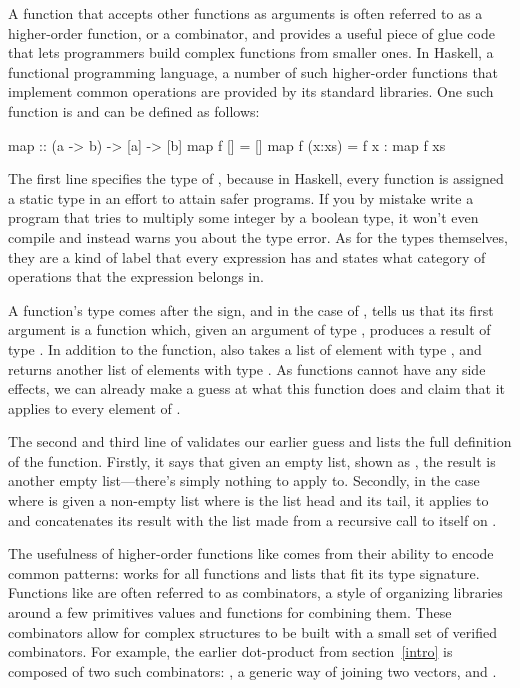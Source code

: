 \documentclass[../paper.tex]{subfiles}
\begin{document}
A function that accepts other functions as arguments is often referred to as a higher-order function, or a combinator, and provides a useful piece of glue code that lets programmers build complex functions from smaller ones. In Haskell, a functional programming language, a number of such higher-order functions that implement common operations are provided by its standard libraries. One such function is  and can be defined as follows:

\begin{code}
map :: (a -> b) -> [a] -> [b]
map f []     = []
map f (x:xs) = f x : map f xs
\end{code}

The first line specifies the type of , because in Haskell, every function is assigned a static type in an effort to attain safer programs. If you by mistake write a program that tries to multiply some integer by a boolean type, it won't even compile and instead warns you about the type error. As for the types themselves, they are a kind of label that every expression has and states what category of operations that the expression belongs in.

A function's type comes after the \codei{::} sign, and in the case of , tells us that its first argument is a function  which, given an argument of type , produces a result of type . In addition to the function,  also takes a list  of element with type , and returns another list of elements with type . As functions cannot have any side effects, we can already make a guess at what this function does and claim that it applies  to every element of .

The second and third line of  validates our earlier guess and lists the full definition of the function. Firstly, it says that given an empty list, shown as \codei{[]}, the result is another empty list---there's simply nothing to apply  to. Secondly, in the case where  is given a non-empty list  where  is the list head and  its tail, it applies  to  and concatenates its result with the list made from a recursive call to itself on .

The usefulness of higher-order functions like  comes from their ability to encode common patterns:  works for all functions and lists that fit its type signature. Functions like  are often referred to as combinators, a style of organizing libraries around a few primitives values and functions for combining them. These combinators allow for complex structures to be built with a small set of verified combinators. For example, the earlier dot-product from section~\ref{intro} is composed of two such combinators: , a generic way of joining two vectors, and .
\end{document}
